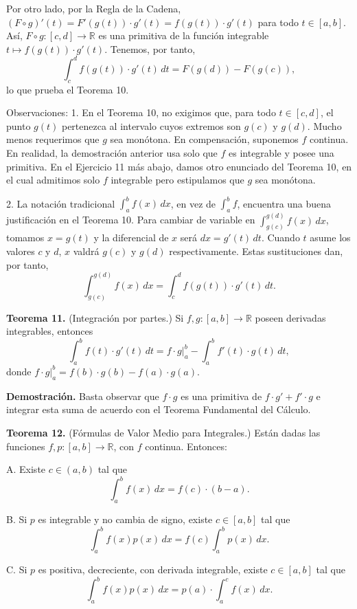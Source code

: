 \documentclass[12pt,oneside]{book}
\begin{document}
Por otro lado, por la Regla de la Cadena, \((F \circ g)'(t) = F'(g(t)) \cdot g'(t) = f(g(t)) \cdot g'(t)\) para todo \(t \in [a, b]\). Así, \(F \circ g: [c, d] \to \mathbb{R}\) es una primitiva de la función integrable \(t \mapsto f(g(t)) \cdot g'(t)\). Tenemos, por tanto,
\[
\int_{c}^{d} f(g(t)) \cdot g'(t) \, dt = F(g(d)) - F(g(c)),
\]
lo que prueba el Teorema 10.

Observaciones: 1. En el Teorema 10, no exigimos que, para todo \(t \in [c, d]\), el punto \(g(t)\) pertenezca al intervalo cuyos extremos son \(g(c)\) y \(g(d)\). Mucho menos requerimos que \(g\) sea monótona. En compensación, suponemos \(f\) continua. En realidad, la demostración anterior usa solo que \(f\) es integrable y posee una primitiva. En el Ejercicio 11 más abajo, damos otro enunciado del Teorema 10, en el cual admitimos solo \(f\) integrable pero estipulamos que \(g\) sea monótona.

2. La notación tradicional \(\int_{a}^{b} f(x) \, dx\), en vez de \(\int_{a}^{b} f\), encuentra una buena justificación en el Teorema 10. Para cambiar de variable en \(\int_{g(c)}^{g(d)} f(x) \, dx\), tomamos \(x = g(t)\) y la diferencial de \(x\) será \(dx = g'(t) \, dt\). Cuando \(t\) asume los valores \(c\) y \(d\), \(x\) valdrá \(g(c)\) y \(g(d)\) respectivamente. Estas sustituciones dan, por tanto,
\[
\int_{g(c)}^{g(d)} f(x) \, dx = \int_{c}^{d} f(g(t)) \cdot g'(t) \, dt.
\]

\textbf{Teorema 11.} (Integración por partes.) Si \(f, g: [a, b] \to \mathbb{R}\) poseen derivadas integrables, entonces
\[
\int_{a}^{b} f(t) \cdot g'(t) \, dt = f \cdot g\Big|_{a}^{b} - \int_{a}^{b} f'(t) \cdot g(t) \, dt,
\]
donde \(f \cdot g\Big|_{a}^{b} = f(b) \cdot g(b) - f(a) \cdot g(a)\).

\textbf{Demostración.} Basta observar que \(f \cdot g\) es una primitiva de \(f \cdot g' + f' \cdot g\) e integrar esta suma de acuerdo con el Teorema Fundamental del Cálculo.

\textbf{Teorema 12.} (Fórmulas de Valor Medio para Integrales.) Están dadas las funciones \(f, p: [a, b] \to \mathbb{R}\), con \(f\) continua. Entonces:

A. Existe \(c \in (a, b)\) tal que
\[
\int_{a}^{b} f(x) \, dx = f(c) \cdot (b - a).
\]

B. Si \(p\) es integrable y no cambia de signo, existe \(c \in [a, b]\) tal que
\[
\int_{a}^{b} f(x) p(x) \, dx = f(c) \int_{a}^{b} p(x) \, dx.
\]

C. Si \(p\) es positiva, decreciente, con derivada integrable, existe \(c \in [a, b]\) tal que
\[
\int_{a}^{b} f(x) p(x) \, dx = p(a) \cdot \int_{a}^{c} f(x) \, dx.
\]
\end{document}

